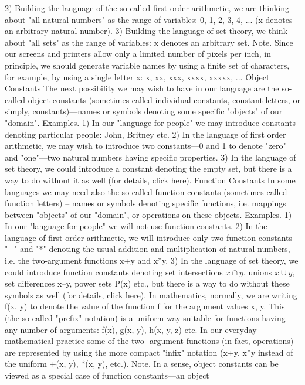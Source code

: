2) Building the language of the so-called first order arithmetic, we are thinking about "all natural numbers" as the range of
variables: 0, 1, 2, 3, 4, ... (x denotes an arbitrary natural number).
3) Building the language of set theory, we think about "all sets" as the range of variables: x denotes an arbitrary set.
Note. Since our screens and printers allow only a limited number of pixels per inch, in principle, we
should generate variable names by using a finite set of characters, for example, by using a single letter x:
x, xx, xxx, xxxx, xxxxx, ...
Object Constants
The next possibility we may wish to have in our language are the so-called object constants (sometimes
called individual constants, constant letters, or simply, constants)---names or symbols denoting some
specific "objects" of our "domain".
Examples. 1) In our "language for people" we may introduce constants denoting particular people: John, Britney etc.
2) In the language of first order arithmetic, we may wish to introduce two constants---0 and 1 to denote "zero" and "one"---two
natural numbers having specific properties.
3) In the language of set theory, we could introduce a constant denoting the empty set, but there is a way to do without it as
well (for details, click here).
Function Constants
In some languages we may need also the so-called function constants (sometimes called function letters)
– names or symbols denoting specific functions, i.e. mappings between "objects" of our "domain", or
operations on these objects.
Examples. 1) In our "language for people" we will not use function constants.
2) In the language of first order arithmetic, we will introduce only two function constants "+" and "*" denoting the usual
addition and multiplication of natural numbers, i.e. the two-argument functions x+y and x*y.
3) In the language of set theory, we could introduce function constants denoting set intersections \(x\cap y\), unions \(x\cup y\), set
differences x–y, power sets P(x) etc., but there is a way to do without these symbols as well (for details, click here).
In mathematics, normally, we are writing f(x, y) to denote the value of the function f for the argument
values x, y. This (the so-called "prefix" notation) is a uniform way suitable for functions having any
number of arguments: f(x), g(x, y), h(x, y, z) etc. In our everyday mathematical practice some of the two-
argument functions (in fact, operations) are represented by using the more compact "infix" notation (x+y,
x*y instead of the uniform +(x, y), *(x, y), etc.).
Note. In a sense, object constants can be viewed as a special case of function constants---an object
